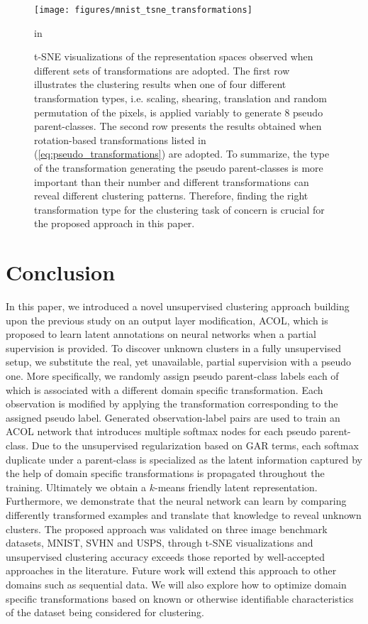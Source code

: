 \documentclass{article} \usepackage{iclr2018_conference,times}
\begin{document}
\begin{figure}[h]
	\begin{center}
		\centerline{\texttt{[image: figures/mnist\_tsne\_transformations]}}
		\caption{t-SNE visualizations of the representation spaces observed when different sets of transformations are adopted. The first row illustrates the clustering results when one of four different transformation types, i.e. scaling, shearing, translation and random permutation of the pixels, is applied variably to generate 8 pseudo parent-classes. The second row presents the results obtained when rotation-based transformations listed in (\ref{eq:pseudo_transformations}) are adopted. To summarize, the type of the transformation generating the pseudo parent-classes is more important than their number and different transformations can reveal different clustering patterns. Therefore, finding the right transformation type for the clustering task of concern is crucial for the proposed approach in this paper.}
		\label{fig:pseudo_impact_trans}
	\end{center}
	 in
\end{figure}

\section{Conclusion}

In this paper, we introduced a novel unsupervised clustering approach building upon the previous study on an output layer modification, ACOL, which is proposed to learn latent annotations on neural networks when a partial supervision is provided. To discover unknown clusters in a fully unsupervised setup, we substitute the real, yet unavailable, partial supervision with a pseudo one. More specifically, we randomly assign pseudo parent-class labels each of which is associated with a different domain specific transformation. Each observation is modified by applying the transformation corresponding to the assigned pseudo label. Generated observation-label pairs are used to train an ACOL network that introduces multiple softmax nodes for each pseudo parent-class. Due to the unsupervised regularization based on GAR terms, each softmax duplicate under a parent-class is specialized as the latent information captured by the help of domain specific transformations is propagated throughout the training. Ultimately we obtain a $k$-means friendly latent representation. Furthermore, we demonstrate that the neural network can learn by comparing differently transformed examples and translate that knowledge to reveal unknown clusters. The proposed approach was validated on three image benchmark datasets, MNIST, SVHN and USPS, through t-SNE visualizations and unsupervised clustering accuracy exceeds those reported by well-accepted approaches in the literature. Future work will extend this approach to other domains such as sequential data. We will also explore how to optimize domain specific transformations based on known or otherwise identifiable characteristics of the dataset being considered for clustering.



\end{document}
